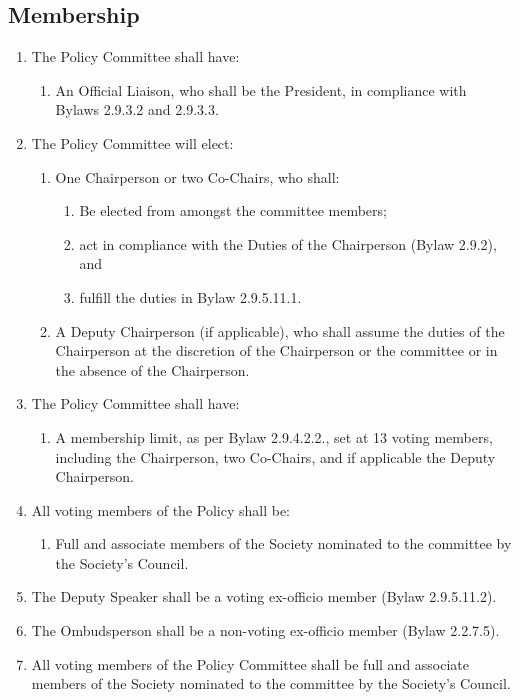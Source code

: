 \subsection{Membership}
\begin{enumerate}[label*=\arabic*., align=left]	
\item The Policy Committee shall have:
\begin{enumerate}[label*=\arabic*., align=left]	
\item An Official Liaison, who shall be the President, in compliance with Bylaws 2.9.3.2 and
2.9.3.3.
\end{enumerate}
\item The Policy Committee will elect:
\begin{enumerate}[label*=\arabic*., align=left]
\item One Chairperson or two Co-Chairs, who shall:
\begin{enumerate}[label*=\arabic*., align=left]
\item Be elected from amongst the committee members;
\item act in compliance with the Duties of the Chairperson (Bylaw 2.9.2), and
\item fulfill the duties in Bylaw 2.9.5.11.1.
\end{enumerate}
\item A Deputy Chairperson (if applicable), who shall assume the duties of the Chairperson at the discretion of the Chairperson or the committee or in the absence of the Chairperson.
\end{enumerate}
\item The Policy Committee shall have:
\begin{enumerate}[label*=\arabic*., align=left]
\item A membership limit, as per Bylaw 2.9.4.2.2., set at 13 voting members, including the Chairperson, two Co-Chairs, and if applicable the Deputy Chairperson.
\end{enumerate}
\item All voting members of the Policy shall be:
\begin{enumerate}[label*=\arabic*., align=left]
\item Full and associate members of the Society nominated to the committee by the Society’s Council.
\end{enumerate}
\item The Deputy Speaker shall be a voting ex-officio member (Bylaw 2.9.5.11.2).
\item The Ombudsperson shall be a non-voting ex-officio member (Bylaw 2.2.7.5).
\item All voting members of the Policy Committee shall be full and associate members of the Society nominated to the committee by the Society’s Council. 
\end{enumerate}

